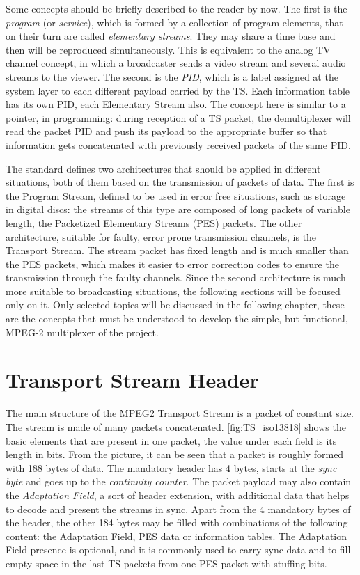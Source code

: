 \documentclass[
	12pt,				%
	openright,			%
	twoside,			%
	a4paper,			%
	brazil,
	french,				%
	english
	]{abntex2}
\begin{document}
Some concepts should be briefly described to the reader by now. The first is the \textit{program} (or \textit{service}), which is formed by a collection of program elements, that on their turn are called \textit{elementary streams}. They may share a time base and then will be reproduced simultaneously. This is equivalent to the analog TV channel concept, in which a broadcaster sends a video stream and several audio streams to the viewer. The second is the \textit{PID}, which is a label assigned at the system layer to each different payload carried by the TS. Each information table has its own PID, each Elementary Stream also. The concept here is similar to a pointer, in programming: during reception of a TS packet, the demultiplexer will read the packet PID and push its payload to the appropriate buffer so that information gets concatenated with previously received packets of the same PID.

The standard defines two architectures that should be applied in different situations, both of them based on the transmission of packets of data. The first is the Program Stream, defined to be used in error free situations, such as storage in digital discs: the streams of this type are composed of long packets of variable length, the Packetized Elementary Streams (PES) packets. The other architecture, suitable for faulty, error prone transmission channels, is the Transport Stream. The stream packet has fixed length and is much smaller than the PES packets, which makes it easier to error correction codes to ensure the transmission through the faulty channels. Since the second architecture is much more suitable to broadcasting situations, the following sections will be focused only on it. Only selected topics will be discussed in the following chapter, these are the concepts that must be understood to develop the simple, but functional, MPEG-2 multiplexer of the project.

\section{Transport Stream Header}
\label{ts_header}
The main structure of the MPEG2 Transport Stream is a packet of constant size. The stream is made of many packets concatenated. \autoref{fig:TS_iso13818} shows the basic elements that are present in one packet, the value under each field is its length in bits. From the picture, it can be seen that a packet is roughly formed with 188 bytes of data. The mandatory header has 4 bytes, starts at the \textit{sync byte} and goes up to the \textit{continuity counter}. The packet payload may also contain the \textit{Adaptation Field}, a sort of header extension, with additional data that helps to decode and present the streams in sync. Apart from the 4 mandatory bytes of the header, the other 184 bytes may be filled with combinations of the following content: the Adaptation Field, PES data or information tables. The Adaptation Field presence is optional, and it is commonly used to carry sync data and to fill empty space in the last TS packets from one PES packet with stuffing bits.
\end{document}
